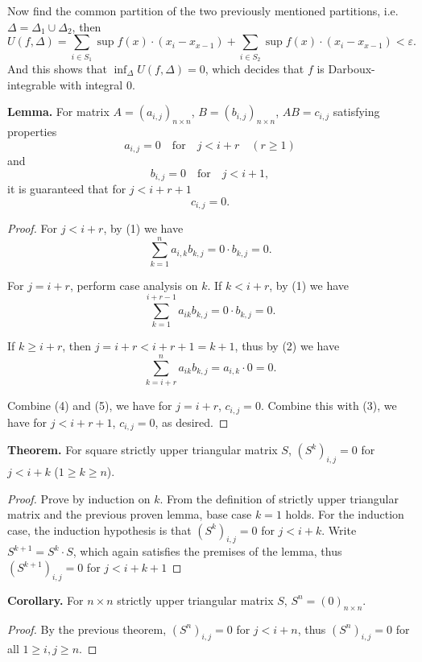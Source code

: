 \documentclass[10pt]{article}
\begin{document}
\begin{CJK*}{UTF8}{gbsn}
Now find the common partition of the two previously mentioned partitions, i.e. $\Delta=\Delta_1\cup\Delta_2$, then
$$
U(f,\Delta)=\sum_{i\in S_1}\sup f(x)\cdot(x_i-x_{x-1})+\sum_{i\in S_2}\sup f(x)\cdot(x_i-x_{x-1})<\varepsilon.
$$
And this shows that $\displaystyle\inf_\Delta U(f,\Delta)=0$, which decides that $f$ is Darboux-integrable with integral $0$.

\newpage
\textbf{Lemma.} For matrix $A=(a_{i,j})_{n\times n}$, $B=(b_{i,j})_{n\times n}$, $AB=c_{i,j}$ satisfying properties
\begin{equation}
a_{i,j}=0\quad\text{for}\quad j<i+r\quad(r\geq1)
\end{equation}
and
\begin{equation}
\label{2}
b_{i,j}=0\quad\text{for}\quad j<i+1,
\end{equation}
it is guaranteed that for $j<i+r+1$
$$
c_{i,j}=0.
$$
\begin{proof}
For $j<i+r$, by (1) we have
\begin{equation}
\label{3}
\sum_{k=1}^na_{i,k}b_{k,j}=0\cdot b_{k,j}=0.
\end{equation}

For $j=i+r$, perform case analysis on $k$. If $k<i+r$, by (1) we have
\begin{equation}
\label{4}
\sum_{k=1}^{i+r-1}a_{ik}b_{k,j}=0\cdot b_{k,j}=0.
\end{equation}

If $k\geq i+r$, then $j=i+r<i+r+1=k+1$, thus by (2) we have
\begin{equation}
\label{5}
\sum_{k=i+r}^{n}a_{ik}b_{k,j}=a_{i,k}\cdot0=0.
\end{equation}

Combine (4) and (5), we have for $j=i+r$, $c_{i,j}=0$.
Combine this with (3), we have for $j<i+r+1$, $c_{i,j}=0$, as desired.
\end{proof}

\textbf{Theorem.} For square strictly upper triangular matrix $S$, $(S^k)_{i,j}=0$ for $j<i+k$ ($1\geq k\geq n$).
\begin{proof}
Prove by induction on $k$. From the definition of strictly upper triangular matrix and the previous proven lemma, base case $k=1$ holds. For the induction case, the induction hypothesis is that $(S^k)_{i,j}=0$ for $j<i+k$. Write $S^{k+1}=S^k\cdot S$, which again satisfies the premises of the lemma, thus $(S^{k+1})_{i,j}=0$ for $j<i+k+1$
\end{proof}

\textbf{Corollary.} For $n\times n$ strictly upper triangular matrix $S$, $S^n=(0)_{n\times n}$.
\begin{proof}
By the previous theorem, $(S^n)_{i,j}=0$ for $j<i+n$, thus $(S^n)_{i,j}=0$ for all $1\geq i,j\geq n$.
\end{proof}


\end{CJK*}
\end{document}
